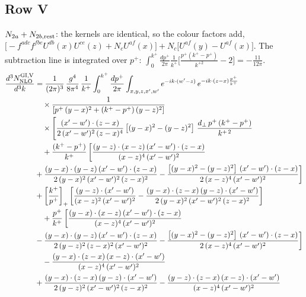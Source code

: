 \documentclass[9pt]{article}
\numberwithin{equation}{section}
\begin{document}
\subsection{Row V}
$N_{2a}+N_{2b,\rm rest}$: the kernels are identical, so the colour factors add, $\big[-f^{adc}f^{fbe}U^{db}(x)U^{ce}(z)+N_{c}U^{af}(x)\big]+N_{c}\big[U^{af}(y)-U^{af}(x)\big]$. The subtraction line is integrated over $p^{+}$: $\int_{0}^{k^{+}}\frac{dp^{+}}{2\pi}\frac{1}{k^{+}}\big[\frac{p^{+}(k^{+}-p^{+})}{k^{+2}}-2\big]=-\frac{11}{12\pi}$.
\begin{align}
\frac{d^{3}N^{\rm GI,V}_{\rm NLO}}{d^{3}k}&=\frac{1}{(2\pi)^{3}}\,\frac{g^{4}}{8\pi^{4}}\,\frac{1}{k^{+}}\int_{0}^{k^{+}}\frac{dp^{+}}{2\pi}\int_{x,y,z,x^{\prime},w^{\prime}}e^{-ik\cdot(w^{\prime}-z)}\,e^{-ik\cdot(z-x)\frac{p^{+}}{k^{+}}}\notag\\&\quad\times\frac{1}{\left[p^{+}\,(y-x)^{2}+(k^{+}-p^{+})\,(y-z)^{2}\right]}\notag\\&\quad\times\Bigg[\frac{(x^{\prime}-w^{\prime})\cdot (z-x)}{2\,(x^{\prime}-w^{\prime})^{2}\,(z-x)^{4}}\left[(y-x)^{2}-(y-z)^{2}\right]\,\frac{d_{\perp}\,p^{+}\,(k^{+}-p^{+})}{k^{+\,2}} \notag\\
&\quad +\frac{(k^{+}-p^{+})}{k^{+}}\,\bigg[\frac{(y-z)\cdot (x-z)\,(x^{\prime}-w^{\prime})\cdot(z-x)}{(x-z)^{4}\,(x^{\prime}-w^{\prime})^{2}}\notag \\ & +\frac{(y-x)\cdot (y-z)\,(x^{\prime}-w^{\prime})\cdot(z-x)}{2\,(y-x)^{2}\,(x^{\prime}-w^{\prime})^{2}\,(z-x)^{2}}-\frac{\left[(y-x)^{2}-(y-z)^{2}\right]\,(x^{\prime}-w^{\prime})\cdot(z-x)}{2\,(x-z)^{4}\,(x^{\prime}-w^{\prime})^{2}}\bigg]\notag \\ &  +\left[\frac{k^{+}}{p^{+}}\right]_{+} \bigg[\frac{(y-z)\cdot (x^{\prime}-w^{\prime})}{(x-z)^{2}\,(x^{\prime}-w^{\prime})^{2}}-\frac{(y-x)\cdot (z-x)\,(y-z)\cdot (x^{\prime}-w^{\prime})}{2\,(y-x)^{2}\,(x^{\prime}-w^{\prime})^{2}\,(z-x)^{2}}\bigg] \notag\\
&\quad +\frac{p^{+}}{k^{+}}\,\bigg[\frac{(y-x)\cdot (x-z)\, (x^{\prime}-w^{\prime})\cdot (z-x)}{(x-z)^{4}\,(x^{\prime}-w^{\prime})^{2}}\notag \\ & -\frac{(y-x)\cdot (y-z)\,(x^{\prime}-w^{\prime})\cdot (z-x)}{2\,(y-z)^{2}\,(z-x)^{2}\,(x^{\prime}-w^{\prime})^{2}}-\frac{\left[(y-x)^{2}-(y-z)^{2}\right]\,(x^{\prime}-w^{\prime})\cdot (z-x)}{2\,(x-z)^{4}\,(x^{\prime}-w^{\prime})^{2}}\bigg]\notag\\
&\quad -\frac{(y-x)\cdot (z-x)\,(x-z)\cdot (x^{\prime}-w^{\prime})}{(x-z)^{4}\,(x^{\prime}-w^{\prime})^{2}}\notag \\ & +\frac{(y-x)\cdot (z-x)\,(y-z)\cdot (x^{\prime}-w^{\prime})}{2\,(y-z)^{2}\,(x^{\prime}-w^{\prime})^{2}\,(z-x)^{2}}-\frac{(y-z)\cdot (z-x)\,(x-z)\cdot (x^{\prime}-w^{\prime})}{(x-z)^{4}\,(x^{\prime}-w^{\prime})^{2}}\notag\\

\end{align}
\end{document}
